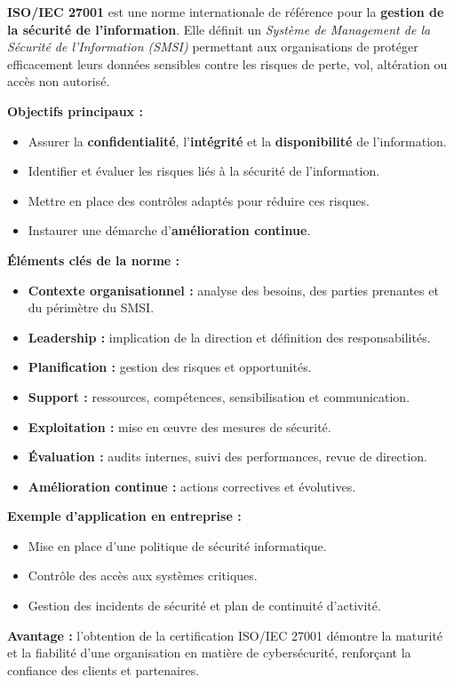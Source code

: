 \documentclass[a4paper,11pt]{article}
\begin{document}
\begin{tcolorbox}[colback=cyan!5,colframe=cyan!60!black,title=Qu'est-ce que l'ISO/IEC 27001 ?]

\textbf{ISO/IEC 27001} est une norme internationale de référence pour la 
\textbf{gestion de la sécurité de l’information}.  
Elle définit un \textit{Système de Management de la Sécurité de l’Information (SMSI)} permettant aux 
organisations de protéger efficacement leurs données sensibles contre les risques de perte, vol, altération ou accès non autorisé.  

\medskip
\textbf{Objectifs principaux :}
\begin{itemize}
  \item Assurer la \textbf{confidentialité}, l’\textbf{intégrité} et la \textbf{disponibilité} de l’information.
  \item Identifier et évaluer les risques liés à la sécurité de l’information.
  \item Mettre en place des contrôles adaptés pour réduire ces risques.
  \item Instaurer une démarche d’\textbf{amélioration continue}.
\end{itemize}

\medskip
\textbf{Éléments clés de la norme :}
\begin{itemize}
  \item \textbf{Contexte organisationnel :} analyse des besoins, des parties prenantes et du périmètre du SMSI.
  \item \textbf{Leadership :} implication de la direction et définition des responsabilités.
  \item \textbf{Planification :} gestion des risques et opportunités.
  \item \textbf{Support :} ressources, compétences, sensibilisation et communication.
  \item \textbf{Exploitation :} mise en œuvre des mesures de sécurité.
  \item \textbf{Évaluation :} audits internes, suivi des performances, revue de direction.
  \item \textbf{Amélioration continue :} actions correctives et évolutives.
\end{itemize}

\medskip
\textbf{Exemple d’application en entreprise :}
\begin{itemize}
  \item Mise en place d’une politique de sécurité informatique.
  \item Contrôle des accès aux systèmes critiques.
  \item Gestion des incidents de sécurité et plan de continuité d’activité.
\end{itemize}

\medskip
\textbf{Avantage :} l’obtention de la certification ISO/IEC 27001 démontre la maturité 
et la fiabilité d’une organisation en matière de cybersécurité, renforçant la confiance des clients et partenaires.
\end{tcolorbox}
\end{document}

